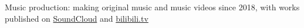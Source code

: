 \documentclass[letter,10pt]{article}
\begin{document}
\begin{zitemize}
\item Music production: making original music and music videos since 2018, with works published on \href{https://soundcloud.com/yifever}{SoundCloud} and \href{https://space.bilibili.com/334342354}{bilibili.tv}
\end{zitemize}
\end{document}
